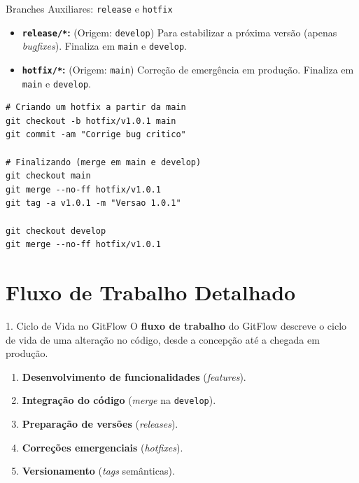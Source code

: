 \documentclass[aspectratio=169]{beamer}
\begin{document}
\begin{frame}[fragile]{Branches Auxiliares: \texttt{release} e \texttt{hotfix}}
    \begin{itemize}
        \item \textbf{\texttt{release/*}:} (Origem: \texttt{develop}) Para estabilizar a próxima versão (apenas \textit{bugfixes}). Finaliza em \texttt{main} e \texttt{develop}.
        \item \textbf{\texttt{hotfix/*}:} (Origem: \texttt{main}) Correção de emergência em produção. Finaliza em \texttt{main} e \texttt{develop}.
    \end{itemize}
    \vspace{0.2cm}
\begin{lstlisting}
# Criando um hotfix a partir da main
git checkout -b hotfix/v1.0.1 main
git commit -am "Corrige bug critico"

# Finalizando (merge em main e develop)
git checkout main
git merge --no-ff hotfix/v1.0.1
git tag -a v1.0.1 -m "Versao 1.0.1"

git checkout develop
git merge --no-ff hotfix/v1.0.1
\end{lstlisting}
\end{frame}

\section{Fluxo de Trabalho Detalhado}

\begin{frame}{1. Ciclo de Vida no GitFlow}
    O \textbf{fluxo de trabalho} do GitFlow descreve o ciclo de vida de uma alteração no código, desde a concepção até a chegada em produção.
    \vspace{0.3cm}
    \begin{enumerate}
        \item \textbf{Desenvolvimento de funcionalidades} (\textit{features}).
        \item \textbf{Integração do código} (\textit{merge} na \texttt{develop}).
        \item \textbf{Preparação de versões} (\textit{releases}).
        \item \textbf{Correções emergenciais} (\textit{hotfixes}).
        \item \textbf{Versionamento} (\textit{tags} semânticas).
    \end{enumerate}
\end{frame}
\end{document}
